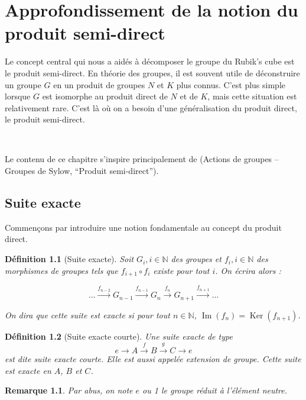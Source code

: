 \documentclass[french]{report}
\newtheorem{definition}{Définition}[section]
\newtheorem*{remark}{Remarque}
\begin{document}
\chapter{Approfondissement de la notion du produit semi-direct} \label{chap_semi_direct}

Le concept central qui nous a aidés à décomposer le groupe du Rubik's cube est le produit semi-direct. En théorie des groupes, il est souvent utile de déconstruire un groupe $G$ en un produit de groupes $N$ et $K$ plus connus. C'est plus simple lorsque $G$ est isomorphe au produit direct de $N$ et de $K$, mais cette situation est relativement rare. C'est là où on a besoin d'une généralisation du produit direct, le produit semi-direct.

\

Le contenu de ce chapitre s'inspire principalement de \cite{theorie_groupes} (Actions de groupes -- Groupes de Sylow, ``Produit semi-direct'').

\section{Suite exacte}

Commençons par introduire une notion fondamentale au concept du produit direct.


\begin{definition}[Suite exacte]
  Soit $G_i, i \in \mathbb{N}$ des groupes et $f_i, i \in \mathbb{N}$ des morphismes de groupes tels que $f _{i+1 } \circ f_i$ existe pour tout $i$. On écrira alors :

\begin{equation*}
  \dots   \stackrel{f _{n-2}}{\longrightarrow}  G _{n-1} \stackrel{f _{n-1}}{\longrightarrow} G_n\stackrel{f_n}{\longrightarrow} G _{n+1} \stackrel{f _{n+1}}{\longrightarrow} \dots
\end{equation*}

On dira que cette suite est exacte si pour tout $n \in \mathbb{N}$, $\operatorname{Im}(f_n) = \operatorname{Ker}(f _{n+1})$.
\end{definition}

\begin{definition}[Suite exacte courte]
  Une suite exacte de type
  \begin{equation} \label{exacte_courte}
    e \longrightarrow A \stackrel{f}{\longrightarrow} B \stackrel{g}{\longrightarrow} C \longrightarrow e
  \end{equation} est dite \emph{suite exacte courte}. Elle est aussi appelée \emph{extension de groupe}. Cette suite est exacte en $A$, $B$ et $C$.
\end{definition}
\begin{remark}
Par abus, on note $e$ ou 1 le groupe réduit à l'élément neutre.
\end{remark}
\end{document}
